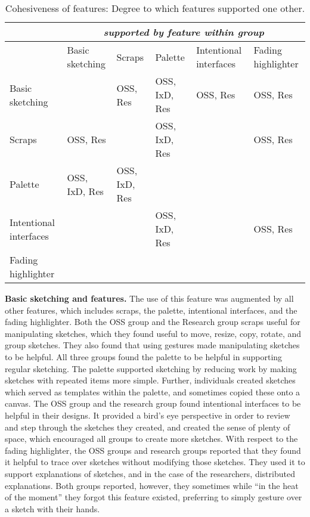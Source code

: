 \begin{table}
\centering
\caption{Cohesiveness of features: Degree to which features supported one other.}
\begin{tabular}{ |p{2cm}|p{2cm}|p{2cm}|p{2cm}|p{2cm}|p{2cm}|}
\hline
&\multicolumn{5}{c|}{\textit{supported by feature within group}} \\
\hline
&Basic sketching &Scraps &Palette &Intentional interfaces & Fading highlighter	\\[5ex]
\hline
Basic sketching &  &	OSS, Res &OSS, IxD, Res &OSS, Res & OSS, Res	\\[5ex]
\hline
Scraps & OSS, Res &  & OSS, IxD, Res &  & OSS, Res	\\[5ex]
\hline
Palette & OSS, IxD, Res & OSS, IxD, Res &  &  &	\\[5ex]
\hline
Intentional interfaces&  &  & OSS, IxD, Res &	 & OSS, Res	\\[5ex]
\hline
Fading highlighter& 	 &	 &	 &	 & \\[5ex]
\hline
\end{tabular}
\label{table:cohesiveness}
\end{table}


\textbf{Basic sketching and features.} The use of this feature was augmented by all other features, which includes scraps, the palette, intentional interfaces, and the fading highlighter. Both the OSS group and the Research group scraps useful for manipulating sketches, which they found useful to move, resize, copy, rotate, and group sketches. They also found that using gestures made manipulating sketches to be helpful. All three groups found the palette to be helpful in supporting regular sketching. The palette supported sketching by reducing work by making sketches with repeated items more simple. Further, individuals created sketches which served as templates within the palette, and sometimes copied these onto a canvas. The OSS group and the research group found intentional interfaces to be helpful in their designs. It provided a bird's eye perspective in order to review and step through the sketches they created, and created the sense of plenty of space, which encouraged all groups to create more sketches. With respect to the fading highlighter, the OSS groups and research groups reported that they found it helpful to trace over sketches without modifying those sketches. They used it to support explanations of sketches, and in the case of the researchers, distributed explanations. Both groups reported, however, they sometimes while ``in the heat of the moment'' they forgot this feature existed, preferring to simply gesture over a sketch with their hands.


